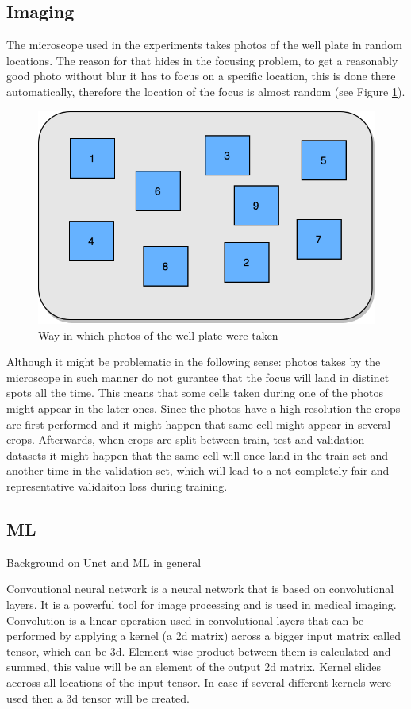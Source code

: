 \subsection{Imaging}
The microscope used in the experiments takes photos of the well plate in random locations. The reason for that hides in the focusing problem, to get a reasonably good photo without blur it has to focus on a specific location, this is done there automatically, therefore the location of the focus is almost random (see Figure \ref{fig:random-dic}). 

\begin{figure}[htb]
	\begin{center}
		\includegraphics[width=0.5\linewidth]{bilder/dic-random.png}
		\caption{Way in which photos of the well-plate were taken}\label{fig:random-dic}
	\end{center}
\end{figure}


Although it might be problematic in the following sense: photos takes by the microscope in such manner do not gurantee that the focus will land in distinct spots all the time. This means that some cells taken during one of the photos might appear in the later ones. Since the photos have a high-resolution the crops are first performed and it might happen that same cell might appear in several crops. Afterwards, when crops are split between train, test and validation datasets it might happen that the same cell will once land in the train set and another time in the validation set, which will lead to a not completely fair and representative validaiton loss during training.

\subsection{ML}
Background on Unet and ML in general

Convoutional neural network is a neural network that is based on convolutional layers. It is a powerful tool for image processing and is used in medical imaging. Convolution is a linear operation used in convolutional layers that can be performed by applying a kernel (a 2d matrix) across a bigger input matrix called tensor, which can be 3d. Element-wise product between them is calculated and summed, this value will be an element of the output 2d matrix. Kernel slides accross all locations of the input tensor. In case if several different kernels were used then a 3d tensor will be created. 

